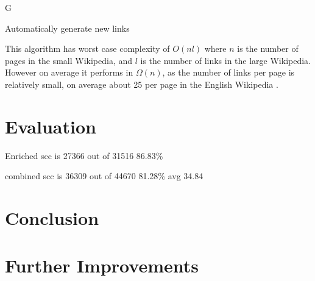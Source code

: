 \documentclass[11pt]{amsart}
\begin{document}
\begin{multicols}{2}
\begin{algorithm}[H]
  
  \Return G
  \hfill \newline
 \caption{Automatically generate new links}
\end{algorithm}
\hfill \newline
This algorithm has worst case complexity of $O(nl)$ where $n$ is the number of pages in the small Wikipedia, and $l$ is the number of links in the large Wikipedia. However on average it performs in $\Omega(n)$, as the number of links per page is relatively small, on average about 25 per page in the English Wikipedia \cite{sixdegrees}.  

\section{Evaluation}




Enriched scc is 27366 out of 31516 86.83\%

combined scc is 36309 out of 44670 81.28\% avg 34.84


\section{Conclusion}

\section{Further Improvements}

\newpage


\end{multicols}
\end{document}
